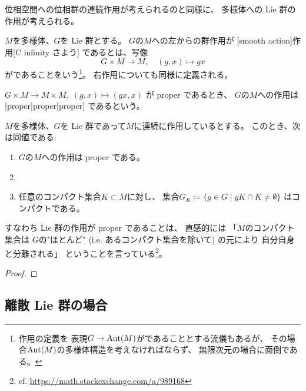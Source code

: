 \documentclass[report]{jlreq}
\begin{document}
位相空間への位相群の連続作用が考えられるのと同様に、
多様体への Lie 群の{\smooth}作用が考えられる。

\begin{definition}[{\smooth}作用]
    $M$を多様体、$G$を Lie 群とする。
    $G$の$M$への左からの群作用が
    [smooth action]{{\smooth}作用}[C infinity さよう]
    であるとは、写像
    \begin{equation}
        G \times M \to M,
        \quad
        (g, x) \mapsto gx
    \end{equation}
    が{\smooth}であることをいう\footnote{
        {\smooth}作用の定義を
        表現$G \to \operatorname{Aut}(M)$が{\smooth}であることとする流儀もあるが、
        その場合$\operatorname{Aut}(M)$の多様体構造を考えなければならず、
        無限次元の場合に面倒である。
    }。
    右作用についても同様に定義される。
\end{definition}

\begin{definition}[proper 作用]
    $G \times M \to M \times M, \; (g, x) \mapsto (gx, x)$
    が proper であるとき、
    $G$の$M$への作用は
    [proper]{proper}[proper]
    であるという。
\end{definition}

\begin{proposition}
    $M$を多様体、$G$を Lie 群であって$M$に連続に作用しているとする。
    このとき、次は同値である:
    \begin{enumerate}
        \item $G$の$M$への作用は proper である。
        \item {}
        \item 任意のコンパクト集合$K \subset M$に対し、
            集合$G_K \coloneqq \{ g \in G \mid gK \cap K \neq \emptyset \}$
            はコンパクトである。
    \end{enumerate}
\end{proposition}

すなわち Lie 群の作用が proper であることは、
直感的には
「$M$のコンパクト集合は
$G$の"ほとんど" (i.e. あるコンパクト集合を除いて) の元により
自分自身と分離される」
ということを言っている\footnote{
    cf. \url{https://math.stackexchange.com/a/989168}
}。

\begin{proof}
    \TODO{}
\end{proof}

\subsection{離散 Lie 群の場合}
\end{document}
